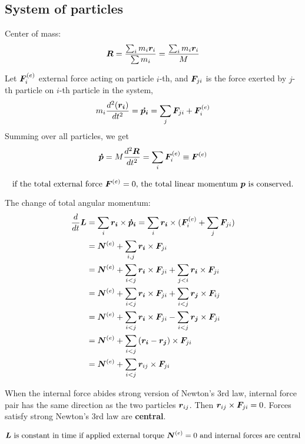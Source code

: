 \documentclass[12pt]{article}
\begin{document}
\subsection{System of particles}
Center of mass: $$\boldsymbol{R} = \frac{\sum_i m_i \boldsymbol{r}_i}{\sum m_i} =  \frac{\sum_i m_i \boldsymbol{r}_i}{M}$$

Let $\boldsymbol{F}^{(e)}_i$ external force acting on particle $i$-th, and $\boldsymbol{F}_{ji}$ is the force 
exerted by $j$-th particle on $i$-th particle in the system, 
$$  m_i \frac{d^2(\boldsymbol{r_i})}{dt^2} = \boldsymbol{\dot{p_i}} = \sum_{j} \boldsymbol{F}_{ji} +  \boldsymbol{F}^{(e)}_i  $$
Summing over all particles, we get $$ \boldsymbol{\dot{p}} =  M \frac{d^2 \boldsymbol{R}}{dt^2} = \sum_i \boldsymbol{F}^{(e)}_i \equiv \boldsymbol{F}^{(e)}$$

\begin{theorem}
	$$\textnormal{if the total external force $\boldsymbol{F}^{(e)} = 0$, the total linear momentum $\boldsymbol{p}$ is conserved.}$$
\end{theorem}

The change of total angular momentum: $$\begin{aligned}
 \frac{d}{dt}\boldsymbol{L} &= \sum_i \boldsymbol{r_i}\times \boldsymbol{\dot{p}_i} = \sum_i \boldsymbol{r_i} \times (\boldsymbol{F}^{(e)}_i + \sum_j \boldsymbol{F}_{ji}) \\
  &= \boldsymbol{N}^{(e)}   + \sum_{i, j} \boldsymbol{r_i} \times \boldsymbol{F}_{ji} \\
  &= \boldsymbol{N}^{(e)}   + \sum_{i < j} \boldsymbol{r_i} \times \boldsymbol{F}_{ji} + \sum_{j < i} \boldsymbol{r_i} \times \boldsymbol{F}_{ji} \\
  &= \boldsymbol{N}^{(e)}   + \sum_{i < j} \boldsymbol{r_i} \times \boldsymbol{F}_{ji} + \sum_{i < j} \boldsymbol{r_j} \times \boldsymbol{F}_{ij} \\
  &= \boldsymbol{N}^{(e)}   + \sum_{i < j} \boldsymbol{r_i} \times \boldsymbol{F}_{ji} - \sum_{i < j} \boldsymbol{r_j} \times \boldsymbol{F}_{ji} \\
  &= \boldsymbol{N}^{(e)}  + \sum_{i < j} \left(\boldsymbol{r_i} - \boldsymbol{r_j} \right) \times \boldsymbol{F}_{ji} \\
  &= \boldsymbol{N}^{(e)}  + \sum_{i < j} \boldsymbol{r}_{ij} \times \boldsymbol{F}_{ji} \\
\end{aligned}$$

When the internal force abides strong version of Newton's 3rd law, internal force pair has the same direction as the two particles $\boldsymbol{r}_{ij}$. Then $\boldsymbol{r}_{ij}  \times \boldsymbol{F}_{ji} = 0$.  Forces satisfy strong Newton's 3rd law are \textbf{central}.
\begin{theorem}
   $$\textnormal{$\boldsymbol{L}$ is constant in time if applied external torque $\boldsymbol{N}^{(e)} = 0$ and internal forces are central}$$
\end{theorem}
\end{document}
